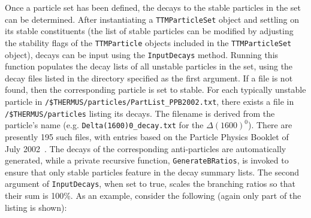 \documentclass{elsarticle}
\begin{document}
Once a particle set has been defined, the decays to the stable particles 
in the set can be determined. After instantiating a \texttt{TTMParticleSet} 
object and settling on its stable constituents (the list of stable particles 
can be modified by adjusting the stability flags 
of the \texttt{TTMParticle} objects included in the \texttt{TTMParticleSet} object), 
decays can be input using the \texttt{InputDecays} method. 
Running this function populates the decay lists of 
all unstable particles in the set, using the decay files listed in the directory 
specified as the first argument. If a file is not found, then the corresponding particle 
is set to stable. For each typically unstable particle in 
\texttt{/\$THERMUS/particles/PartList\_PPB2002.txt}, there exists a file in 
\texttt{/\$THERMUS/particles} listing its decays. The 
filename is derived from the particle's name (e.g. \texttt{Delta(1600)0\_decay.txt} 
for the $\Delta(1600)^0$). There are presently 195 such files, with entries 
based on the Particle Physics Booklet of July 2002~\cite{Hagiwara:2002fs}. The decays of the 
corresponding anti-particles are 
automatically generated, while a private recursive function, \texttt{GenerateBRatios}, 
is invoked to ensure that only stable particles feature in the decay summary lists. The second argument of \texttt{InputDecays}, when set to true, scales the 
branching ratios so that their sum is 100\%. As an example, consider the 
following (again only part of the listing is shown):\\
\end{document}
